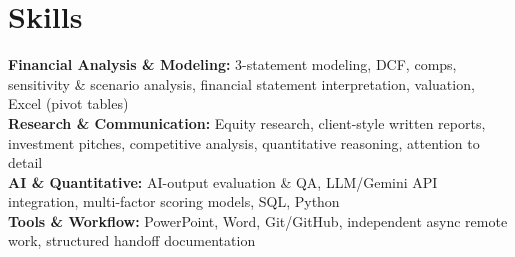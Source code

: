 \documentclass[10pt,letterpaper]{article}
\begin{document}
\section*{Skills}
\textbf{Financial Analysis \& Modeling:} 3-statement modeling, DCF, comps, sensitivity \& scenario analysis, financial statement interpretation, valuation, Excel (pivot tables)\\[2pt]
\textbf{Research \& Communication:} Equity research, client-style written reports, investment pitches, competitive analysis, quantitative reasoning, attention to detail\\[2pt]
\textbf{AI \& Quantitative:} AI-output evaluation \& QA, LLM/Gemini API integration, multi-factor scoring models, SQL, Python\\[2pt]
\textbf{Tools \& Workflow:} PowerPoint, Word, Git/GitHub, independent async remote work, structured handoff documentation
\end{document}
